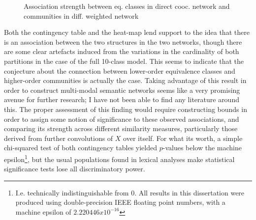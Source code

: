 



\begin{figure}
    \centerfloat
    
    \caption[Association between eq. classes and communities]{
        Association strength between eq. classes in direct cooc. network and communities in diff. weighted network
    }
    \label{fig:block_assoc}
\end{figure}

Both the contingency table and the heat-map lend support to the idea that there is an association between the two structures in the two networks, though there are some clear artefacts induced from the variations in the cardinality of both partitions in the case of the full 10-class model.
This seems to indicate that the conjecture about the connection between lower-order equivalence classes and higher-order communities is actually the case.
Taking advantage of this result in order to construct multi-modal semantic networks seems like a very promising avenue for further research; I have not been able to find any literature around this.
The proper assessment of this finding would require constructing bounds in order to assign some notion of significance to these observed associations, and comparing its strength across different similarity measures, particularly those derived from further convolutions of $X$ over itself.
For what its worth, a simple chi-squared test of both contingency tables yielded $p$-values below the machine epsilon\footnote{
    I.e. technically indistinguishable from 0.
    All results in this dissertation were produced using double-precision IEEE floating point numbers, with a machine epsilon of $2.220446x10^{-16}$
}, but the usual populations found in lexical analyses make statistical significance tests lose all discriminatory power.

